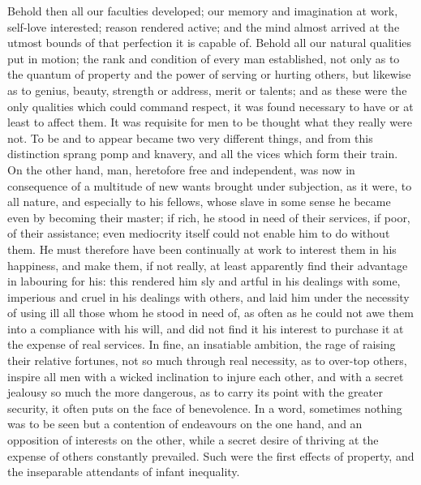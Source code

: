 \documentclass[11pt,twocolumn]{ltugboat}
\begin{document}
Behold then all our faculties developed; our memory and imagination at
work, self-love interested; reason rendered active; and the mind
almost arrived at the utmost bounds of that perfection it is capable
of. Behold all our natural qualities put in motion; the rank and
condition of every man established, not only as to the quantum of
property and the power of serving or hurting others, but likewise as
to genius, beauty, strength or address, merit or talents; and as these
were the only qualities which could command respect, it was found
necessary to have or at least to affect them. It was requisite for men
to be thought what they really were not. To be and to appear became
two very different things, and from this distinction sprang pomp and
knavery, and all the vices which form their train. On the other hand,
man, heretofore free and independent, was now in consequence of a
multitude of new wants brought under subjection, as it were, to all
nature, and especially to his fellows, whose slave in some sense he
became even by becoming their master; if rich, he stood in need of
their services, if poor, of their assistance; even mediocrity itself
could not enable him to do without them. He must therefore have been
continually at work to interest them in his happiness, and make them,
if not really, at least apparently find their advantage in labouring
for his: this rendered him sly and artful in his dealings with some,
imperious and cruel in his dealings with others, and laid him under
the necessity of using ill all those whom he stood in need of, as
often as he could not awe them into a compliance with his will, and
did not find it his interest to purchase it at the expense of real
services. In fine, an insatiable ambition, the rage of raising their
relative fortunes, not so much through real necessity, as to over-top
others, inspire all men with a wicked inclination to injure each
other, and with a secret jealousy so much the more dangerous, as to
carry its point with the greater security, it often puts on the face
of benevolence. In a word, sometimes nothing was to be seen but a
contention of endeavours on the one hand, and an opposition of
interests on the other, while a secret desire of thriving at the
expense of others constantly prevailed. Such were the first effects of
property, and the inseparable attendants of infant inequality.
\end{document}
